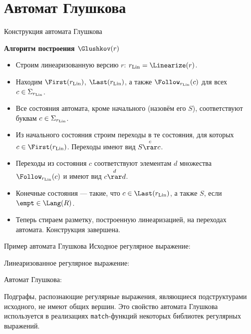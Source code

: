 \section{Автомат Глушкова}
\begin{frame}{Конструкция автомата Глушкова}
    \begin{block}{\bf Алгоритм построения $\Glushkov(r)$}
        \begin{itemize}
            \item Строим линеаризованную версию $r$: $r_{\rm Lin} =\Linearize(r)$.
            \item Находим $\First(r_{\rm Lin})$, $\Last(r_{\rm Lin})$, а также $\Follow_{r_{\rm Lin}}(c)$ для всех $c\in\Sigma_{r_{\rm Lin}}$.
            \item Все состояния автомата, кроме начального (назовём его $S$), соответствуют буквам $c\in\Sigma_{r_{\rm Lin}}$.
            \item Из начального состояния строим переходы в те состояния, для которых $c\in\First(r_{\rm Lin})$. Переходы имеют вид $S\overset{c}{\rar}{c}$.
            \item Переходы из состояния $c$ соответствуют элементам $d$ множества $\Follow_{r_{\rm Lin}}(c)$ и имеют вид $c\overset{d}{\rar}{d}$.
            \item Конечные состояния --- такие, что $c\in\Last(r_{\rm Lin})$, а также $S$, если $\empt\in\Lang(R)$.
            \item Теперь стираем разметку, построенную линеаризацией, на переходах автомата. Конструкция завершена.
        \end{itemize}
    \end{block} %
\end{frame}

\begin{frame}{Пример автомата Глушкова}
    Исходное регулярное выражение:


    Линеаризованное регулярное выражение:

    Автомат Глушкова:


    Подграфы, распознающие регулярные выражения, являющиеся подструктурами исходного, не имеют общих вершин. Это свойство автомата Глушкова используется в реализациях \texttt{match}-функций некоторых библиотек регулярных выражений. %
\end{frame}